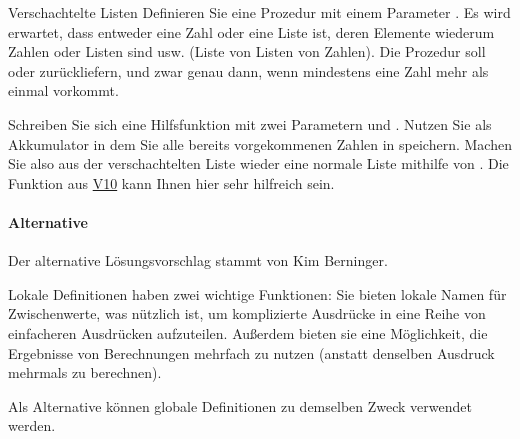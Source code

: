 \documentclass{../tuda-exercise}
\begin{document}
  \begin{task}[credit=\stars{3}{3}]{Verschachtelte Listen}
    Definieren Sie eine Prozedur  mit einem Parameter
    . Es wird erwartet, dass  entweder eine Zahl
    oder eine Liste ist, deren Elemente wiederum Zahlen oder Listen sind usw. (Liste von Listen
    von Zahlen). Die Prozedur  soll  oder
     zurückliefern, und zwar  genau dann, wenn
    mindestens eine Zahl mehr als einmal vorkommt.

    \begin{note}[title=Hinweis:, color=tuda-orange]
      Schreiben Sie sich eine Hilfsfunktion  mit zwei Parametern
       und . Nutzen Sie  als
      Akkumulator in dem Sie alle bereits vorgekommenen Zahlen in  speichern.
      Machen Sie also aus der verschachtelten Liste wieder eine normale Liste mithilfe von
      . Die Funktion aus  \hyperref[task:V10]{V10} kann Ihnen hier sehr
      hilfreich sein.
    \end{note}

    \begin{solution}
      

      \clearpage

      \paragraph{Alternative}

      Der alternative Lösungsvorschlag stammt von Kim Berninger.
      

      \begin{note}[title=Information:]
        Lokale Definitionen haben zwei wichtige Funktionen: Sie bieten lokale Namen für
        Zwischenwerte, was nützlich ist, um komplizierte Ausdrücke in eine Reihe von einfacheren
        Ausdrücken aufzuteilen. Außerdem bieten sie eine Möglichkeit, die Ergebnisse von
        Berechnungen mehrfach zu nutzen (anstatt denselben Ausdruck mehrmals zu berechnen).

        \br

        Als Alternative können globale Definitionen zu demselben Zweck verwendet werden.
      \end{note}
    \end{solution}
  \end{task}
\end{document}
